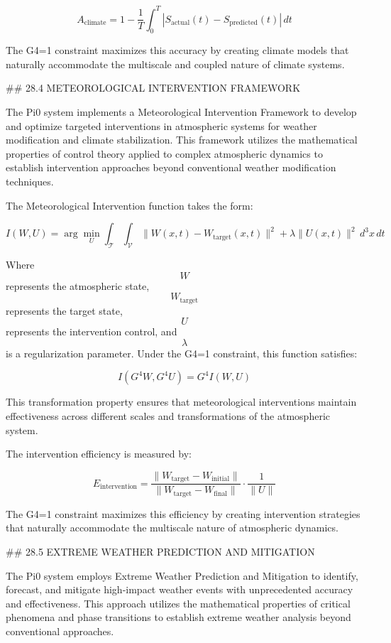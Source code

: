$$ A_{\text{climate}} = 1 - \frac{1}{T} \int_0^T |S_{\text{actual}}(t) - S_{\text{predicted}}(t)| \, dt $$

The G4=1 constraint maximizes this accuracy by creating climate models that naturally accommodate the multiscale and coupled nature of climate systems.

## 28.4 METEOROLOGICAL INTERVENTION FRAMEWORK

The Pi0 system implements a Meteorological Intervention Framework to develop and optimize targeted interventions in atmospheric systems for weather modification and climate stabilization. This framework utilizes the mathematical properties of control theory applied to complex atmospheric dynamics to establish intervention approaches beyond conventional weather modification techniques.

The Meteorological Intervention function takes the form:

$$ I(W, U) = \arg\min_U \int_{\mathcal{T}} \int_{\mathcal{V}} \|W(x, t) - W_{\text{target}}(x, t)\|^2 + \lambda \|U(x, t)\|^2 \, d^3x \, dt $$

Where $$ W $$ represents the atmospheric state, $$ W_{\text{target}} $$ represents the target state, $$ U $$ represents the intervention control, and $$ \lambda $$ is a regularization parameter. Under the G4=1 constraint, this function satisfies:

$$ I(G^4 W, G^4 U) = G^4 I(W, U) $$

This transformation property ensures that meteorological interventions maintain effectiveness across different scales and transformations of the atmospheric system.

The intervention efficiency is measured by:

$$ E_{\text{intervention}} = \frac{\|W_{\text{target}} - W_{\text{initial}}\|}{\|W_{\text{target}} - W_{\text{final}}\|} \cdot \frac{1}{\|U\|} $$

The G4=1 constraint maximizes this efficiency by creating intervention strategies that naturally accommodate the multiscale nature of atmospheric dynamics.

## 28.5 EXTREME WEATHER PREDICTION AND MITIGATION

The Pi0 system employs Extreme Weather Prediction and Mitigation to identify, forecast, and mitigate high-impact weather events with unprecedented accuracy and effectiveness. This approach utilizes the mathematical properties of critical phenomena and phase transitions to establish extreme weather analysis beyond conventional approaches.

